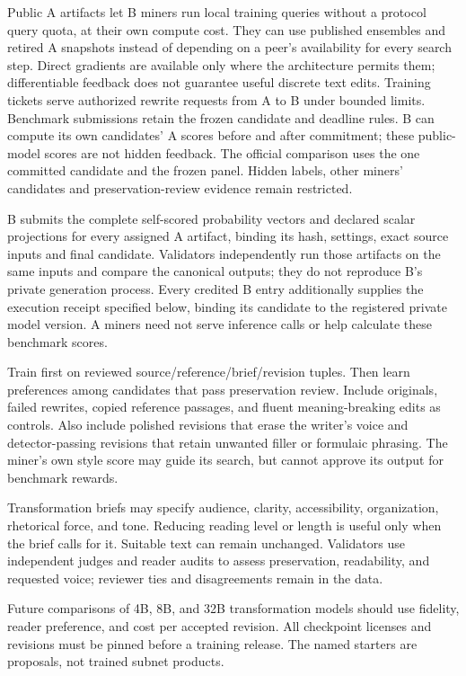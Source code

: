 Public A artifacts let B miners run local training queries without a
protocol query quota, at their own compute cost. They can use published
ensembles and retired A snapshots instead of depending on a peer's
availability for every search step. Direct gradients are available only
where the architecture permits them; differentiable feedback does not
guarantee useful discrete text edits. Training tickets serve authorized
rewrite requests from A to B under bounded limits. Benchmark submissions retain the frozen
candidate and deadline rules.
B can compute its own candidates' A scores before and after commitment;
these public-model scores are not hidden feedback. The official comparison
uses the one committed candidate and the frozen panel. Hidden labels,
other miners' candidates and preservation-review evidence remain restricted.

B submits the complete self-scored probability vectors and declared scalar
projections for every assigned A artifact, binding its hash, settings,
exact source inputs and final candidate. Validators independently run
those artifacts on the same inputs and compare the canonical outputs;
they do not reproduce B's private generation process. Every credited B
entry additionally supplies the execution receipt specified below,
binding its candidate to the registered private model version. A miners
need not serve inference calls or help calculate these benchmark scores.

Train first on reviewed source/reference/brief/revision tuples. Then
learn preferences among candidates that pass preservation review.
Include originals, failed rewrites, copied reference passages, and
fluent meaning-breaking edits as controls. Also include polished
revisions that erase the writer's voice and detector-passing revisions
that retain unwanted filler or formulaic phrasing. The miner's own style score may
guide its search, but cannot approve its output for benchmark rewards.

Transformation briefs may specify audience, clarity, accessibility,
organization, rhetorical force, and tone. Reducing reading level or
length is useful only when the brief calls for it. Suitable text
can remain unchanged. Validators use independent judges and reader
audits to assess preservation, readability, and requested voice;
reviewer ties and disagreements remain in the data.

Future comparisons of 4B, 8B, and 32B transformation models should use fidelity,
reader preference, and cost per accepted revision. All checkpoint
licenses and revisions must be pinned before a training release. The
named starters are proposals, not trained subnet products.

